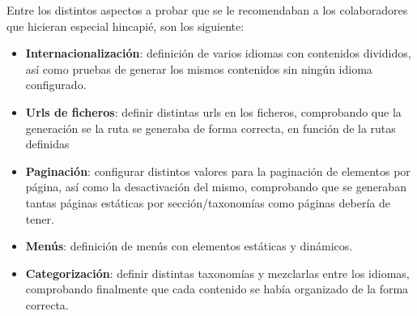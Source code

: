 Entre los distintos aspectos a probar que se le recomendaban a los
colaboradores que hicieran especial hincapié, son los siguiente:

\begin{itemize}
\item \textbf{Internacionalización}: definición de varios idiomas con contenidos divididos, así como pruebas de generar
los mismos contenidos sin ningún idioma configurado.
\item \textbf{Urls de ficheros}: definir distintas urls en los ficheros, comprobando que la generación se la ruta
se generaba de forma correcta, en función de la rutas definidas
\item \textbf{Paginación}: configurar distintos valores para la paginación de elementos por página, así como la desactivación
del mismo, comprobando que se generaban tantas páginas estáticas por sección/taxonomías como páginas debería de tener.
\item \textbf{Menús}: definición de menús con elementos estáticas y dinámicos.
\item \textbf{Categorización}: definir distintas taxonomías y mezclarlas entre los idiomas, comprobando finalmente que cada
contenido se había organizado de la forma correcta.
\end{itemize}
